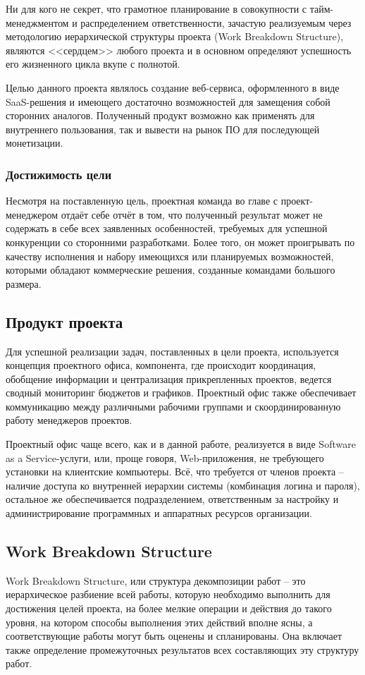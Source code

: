 \documentclass[a4paper, 14pt]{extarticle}
\begin{document}
Ни для кого не секрет, что грамотное планирование в совокупности с тайм-менеджментом и распределением ответственности, зачастую реализуемым через методологию иерархической структуры проекта (Work Breakdown Structure), являются <<сердцем>> любого проекта и в основном определяют успешность его жизненного цикла вкупе с полнотой.

Целью данного проекта являлось создание веб-сервиса, оформленного в виде SaaS-решения и имеющего достаточно возможностей для замещения собой сторонних аналогов. Полученный продукт возможно как применять для внутреннего пользования, так и вывести на рынок ПО для последующей монетизации.

\subsubsection{Достижимость цели}
Несмотря на поставленную цель, проектная команда во главе с проект-менеджером отдаёт себе отчёт в том, что полученный результат может не содержать в себе всех заявленных особенностей, требуемых для успешной конкуренции со сторонними разработками. Более того, он может проигрывать по качеству исполнения и набору имеющихся или планируемых возможностей, которыми обладают коммерческие решения, созданные командами большого размера.
	
	
\subsection{Продукт проекта}

Для успешной реализации задач, поставленных в цели проекта, используется концепция проектного офиса, компонента, где происходит координация, обобщение информации и централизация прикрепленных проектов, ведется сводный мониторинг бюджетов и графиков. Проектный офис также обеспечивает коммуникацию между различными рабочими группами и скоординированную работу менеджеров проектов.

Проектный офис чаще всего, как и в данной работе, реализуется в виде Software as a Service-услуги, или, проще говоря, Web-приложения, не требующего установки на клиентские компьютеры. Всё, что требуется от членов проекта -- наличие доступа ко внутренней иерархии системы (комбинация логина и пароля), остальное же обеспечивается подразделением, ответственным за настройку и администрирование программных и аппаратных ресурсов организации.


\subsection{Work Breakdown Structure}
Work Breakdown Structure, или структура декомпозиции работ -- это иерархическое разбиение всей работы, которую необходимо выполнить для достижения целей проекта, на более мелкие операции и действия до такого уровня, на котором способы выполнения этих действий вполне ясны, а соответствующие работы могут быть оценены и спланированы. Она включает также определение промежуточных результатов всех составляющих эту структуру работ.
\end{document}

